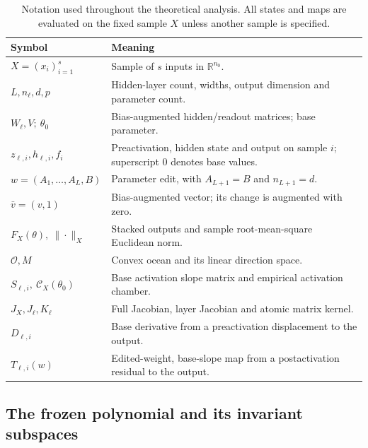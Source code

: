 \documentclass[twoside]{article}
\theoremstyle{remark}
\newcommand{\R}{\mathbb R}
\newcommand{\cC}{\mathcal C}
\theoremstyle{highlightdefinition}
\theoremstyle{remark}
\begin{document}
\begin{table}[!htbp]\centering
\caption{Notation used throughout the theoretical analysis. All states and maps are evaluated on the fixed sample $X$ unless another sample is specified.}\label{tab:appendix-notation}
\small\renewcommand{\arraystretch}{1.12}
\begin{tabular}{p{.25\linewidth}>{\columncolor{black!8}}p{.68\linewidth}}\toprule
Symbol & Meaning\\\midrule
$X=(x_i)_{i=1}^s$ & Sample of $s$ inputs in $\R^{n_0}$.\\
$L,n_\ell,d,p$ & Hidden-layer count, widths, output dimension and parameter count.\\
$W_\ell,V;\ \theta_0$ & Bias-augmented hidden/readout matrices; base parameter.\\
$z_{\ell,i},h_{\ell,i},f_i$ & Preactivation, hidden state and output on sample $i$; superscript $0$ denotes base values.\\
$w=(A_1,\ldots,A_L,B)$ & Parameter edit, with $A_{L+1}=B$ and $n_{L+1}=d$.\\
$\bar v=(v,1)$ & Bias-augmented vector; its change is augmented with zero.\\
$F_X(\theta),\ \|\cdot\|_X$ & Stacked outputs and sample root-mean-square Euclidean norm.\\
$\mathcal O,M$ & Convex ocean and its linear direction space.\\
$S_{\ell,i},\ \cC_X(\theta_0)$ & Base activation slope matrix and empirical activation chamber.\\
$J_X,J_\ell,K_\ell$ & Full Jacobian, layer Jacobian and atomic matrix kernel.\\
$D_{\ell,i}$ & Base derivative from a preactivation displacement to the output.\\
$T_{\ell,i}(w)$ & Edited-weight, base-slope map from a postactivation residual to the output.\\\bottomrule
\end{tabular}
\end{table}

\subsection{The frozen polynomial and its invariant subspaces}
\label{app:coefficient-test}
\end{document}

